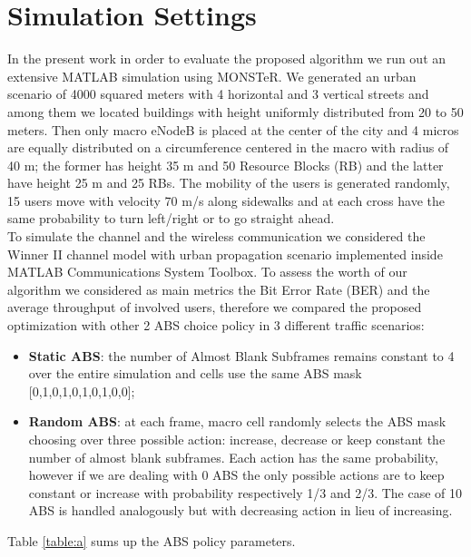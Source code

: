 \documentclass[conference,10pt]{IEEEtran}
\begin{document}
\section{Simulation Settings}
In the present work in order to evaluate the proposed algorithm we run out an extensive MATLAB simulation using MONSTeR. We generated an urban scenario of 4000 squared meters with 4 horizontal and 3 vertical streets and among them we located buildings with height uniformly distributed from 20 to 50 meters. Then only macro eNodeB is placed at the center of the city and 4 micros are equally distributed on a circumference centered in the macro with radius of 40 m; the former has height 35 m and 50 Resource Blocks (RB) and the latter have height 25 m and 25 RBs. The mobility of the users is generated randomly, 15 users move with velocity 70 m/s along sidewalks and at each cross have the same probability to turn left/right or to go straight ahead.\\
To simulate the channel and the wireless communication we considered the Winner II channel model \cite{bultitude20074} with urban propagation scenario implemented inside MATLAB Communications System Toolbox.
To assess the worth of our algorithm we considered as main metrics the Bit Error Rate (BER) and the average throughput of involved users, therefore we compared the proposed optimization with other 2 ABS choice policy in 3 different traffic scenarios:
\begin{itemize}
	\item \textbf{Static ABS}: the number of Almost Blank Subframes remains constant to 4 over the entire simulation and  cells use the same ABS mask 
    [0,1,0,1,0,1,0,1,0,0];
    \item \textbf{Random ABS}:  at each frame, macro cell randomly selects the ABS mask choosing over three possible action: increase, decrease or keep constant the number of almost blank subframes. Each action has the same probability, however if we are dealing with 0 ABS the only possible actions are to keep constant or increase with probability respectively 1/3 and 2/3. The case of 10 ABS is handled analogously but with decreasing action in lieu of increasing.
\end{itemize}
Table \ref{table:a} sums up the ABS policy parameters.
\end{document}
